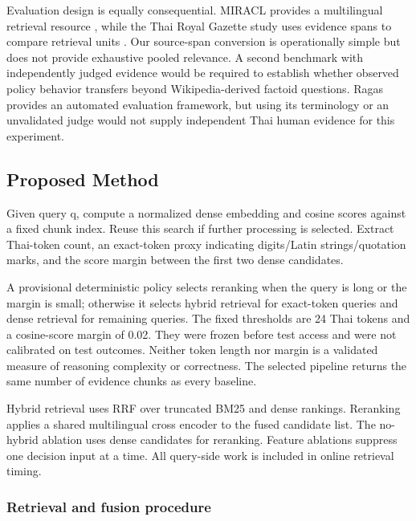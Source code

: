 Evaluation design is equally consequential. MIRACL provides a
multilingual retrieval resource \citep{ref11}, while the Thai Royal
Gazette study uses evidence spans to compare retrieval units
\citep{ref15}. Our source-span conversion is operationally simple but
does not provide exhaustive pooled relevance. A second benchmark with
independently judged evidence would be required to establish whether
observed policy behavior transfers beyond Wikipedia-derived factoid
questions. Ragas \citep{ref12} provides an automated evaluation
framework, but using its terminology or an unvalidated judge would not
supply independent Thai human evidence for this experiment.

\hypertarget{proposed-method}{%
\subsection{Proposed Method}\label{proposed-method}}

Given query q, compute a normalized dense embedding and cosine scores
against a fixed chunk index. Reuse this search if further processing is
selected. Extract Thai-token count, an exact-token proxy indicating
digits/Latin strings/quotation marks, and the score margin between the
first two dense candidates.

A provisional deterministic policy selects reranking when the query is
long or the margin is small; otherwise it selects hybrid retrieval for
exact-token queries and dense retrieval for remaining queries. The fixed
thresholds are 24 Thai tokens and a cosine-score margin of 0.02. They
were frozen before test access and were not calibrated on test outcomes.
Neither token length nor margin is a validated measure of reasoning
complexity or correctness. The selected pipeline returns the same number
of evidence chunks as every baseline.

Hybrid retrieval uses RRF over truncated BM25 and dense rankings.
Reranking applies a shared multilingual cross encoder to the fused
candidate list. The no-hybrid ablation uses dense candidates for
reranking. Feature ablations suppress one decision input at a time. All
query-side work is included in online retrieval timing.

\hypertarget{retrieval-and-fusion-procedure}{%
\subsubsection{Retrieval and fusion
procedure}\label{retrieval-and-fusion-procedure}}

